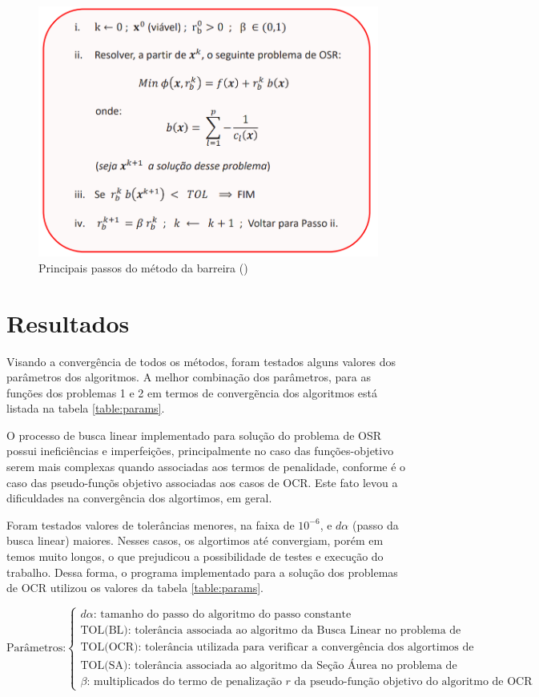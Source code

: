\documentclass[10pt, a4paper]{article}
\begin{document}
\begin{figure}[H]
      \centering
      \includegraphics[width=.6\textwidth]{algoritmoBarreira.PNG}
      \caption{Principais passos do m\'etodo da barreira (\cite{ppt})}
      \label{fig:algoritmoBarreira}
\end{figure}

\section{Resultados}

Visando a converg\^encia de todos os m\'etodos, foram testados alguns valores dos par\^ametros dos algoritmos. A melhor combina\c c\~ao dos par\^ametros, para as fun\c c\~oes dos problemas 1 e 2 em termos de converg\~encia dos algoritmos est\'a listada na tabela \ref{table:params}.

O processo de busca linear implementado para solu\c c\~ao do problema de OSR possui inefici\^encias e imperfei\c c\~oes, principalmente no caso das fun\c c\~oes-objetivo serem mais complexas quando associadas aos termos de penalidade, conforme \'e o caso das pseudo-fun\c c\~os objetivo associadas aos casos de OCR. Este fato levou a dificuldades na converg\^encia dos algortimos, em geral.

Foram testados valores de toler\^ancias menores, na faixa de $10^{-6}$, e $d\alpha$ (passo da busca linear) maiores. Nesses casos, os algortimos at\'e convergiam, por\'em em temos muito longos, o que prejudicou a possibilidade de testes e execu\c c\~ao do trabalho. Dessa forma, o programa implementado para a solu\c c\~ao dos problemas de OCR utilizou os valores da tabela \ref{table:params}.

\small
$$
\text{Par\^ametros:} \begin{cases}
      \text{$d\alpha$:  tamanho do passo do algoritmo do passo constante}\\
      \text{TOL(BL):    toler\^ancia associada ao algoritmo da Busca Linear no problema de OSR}\\
      \text{TOL(OCR):   toler\^ancia utilizada para verificar a converg\^encia dos algortimos de OCR}\\
      \text{TOL(SA):    toler\^ancia associada ao algoritmo da Se\c c\~ao \'Aurea no problema de OSR}\\
      \text{$\beta$:    multiplicados do termo de penaliza\c c\~ao $r$ da pseudo-fun\c c\~ao objetivo do algoritmo de OCR}
\end{cases}
$$
\normalsize
\end{document}
